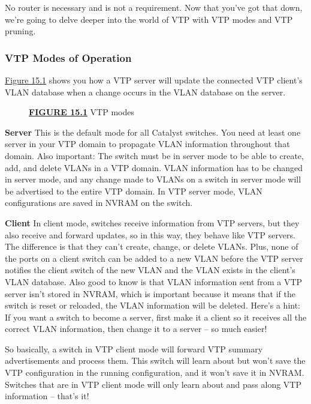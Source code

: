 \documentclass[b5paper,11pt]{memoir}
\begin{document}
No router is necessary and is not a requirement. Now that you've got
that down, we're going to delve deeper into the world of VTP with VTP
modes and VTP pruning.

\subsubsection[VTP Modes of
Operation]{\texorpdfstring{\protect\hypertarget{c15.xhtmlux5cux23c15-sec-5}{}{}VTP
Modes of Operation}{VTP Modes of Operation}}

\protect\hyperlink{c15.xhtmlux5cux23figure15-1}{Figure 15.1} shows you
how a VTP server will update the connected VTP client's VLAN database
when a change occurs in the VLAN database on the server.

\begin{figure}
\centering
\caption{{\protect\hyperlink{c15.xhtmlux5cux23figureanchor15-1}{\textbf{FIGURE
15.1}} VTP modes}}
\end{figure}

\textbf{Server} This
is the default mode for all Catalyst switches. You need at least one
server in your VTP domain to propagate VLAN information throughout that
domain. Also important: The switch must be in server mode to be able to
create, add, and delete VLANs in a VTP domain. VLAN information has to
be changed in server mode, and any change made to VLANs on a switch in
server mode will be advertised to the entire VTP domain. In VTP server
mode, VLAN configurations are saved in NVRAM on the switch.

\textbf{Client} In client mode, switches receive information from VTP
servers, but they also receive and forward updates, so in this way, they
behave like VTP servers. The difference is that they can't create,
change, or delete VLANs. Plus, none of the ports on a client switch can
be added to a new VLAN before the VTP server notifies the client switch
of the new VLAN and the VLAN exists in the client's VLAN database. Also
good to know is that VLAN information sent from a VTP server isn't
stored in NVRAM, which is important because it means that if the switch
is reset or reloaded, the VLAN information will be deleted. Here's a
hint: If you want a switch to become a server, first make it a client so
it receives all the correct VLAN information, then change it to a
server -- so much easier!

So basically, a switch in VTP client mode will forward VTP summary
advertisements and process them. This switch will learn about but won't
save the VTP configuration in the running configuration, and it won't
save it in NVRAM. Switches that are in VTP client mode will only learn
about and pass along VTP information -- that's it!
\end{document}
